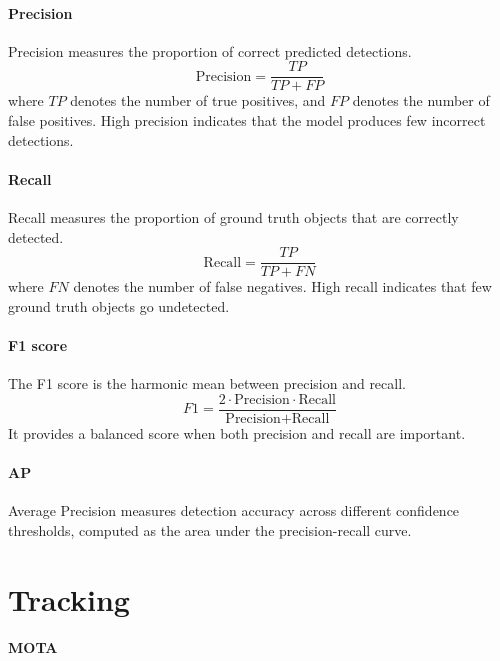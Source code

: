 \documentclass[author={Jacob Stephenson},
    degree={BSc},
    title={Robust Great Ape Species Detection in Wild Camera Trap Imagery with Promptable Concept Segmentation},
    unit={COMS30045},
    subtitle={}]{dissertation}
\begin{document}
\paragraph{Precision}

Precision measures the proportion of correct predicted detections.
\begin{equation}
    \text{Precision} = \frac{TP}{TP + FP}
\end{equation}
where $TP$ denotes the number of true positives, and $FP$ denotes the number of false positives. High precision indicates that the model produces few incorrect detections.


\paragraph{Recall}

Recall measures the proportion of ground truth objects that are correctly detected.
\begin{equation}
    \text{Recall} = \frac{TP}{TP + FN}
\end{equation}
where $FN$ denotes the number of false negatives. High recall indicates that few ground truth objects go undetected.


\paragraph{F1 score}

The F1 score is the harmonic mean between precision and recall.
\begin{equation}
    F1 =
    \frac{2 \cdot \text{Precision} \cdot \text{Recall}}
    {\text{Precision} + \text{Recall}}
\end{equation}
It provides a balanced score when both precision and recall are important.


\paragraph{AP}

Average Precision measures detection accuracy across different confidence thresholds, computed as the area under the precision-recall curve.



\section{Tracking}

\paragraph{MOTA}
\end{document}
